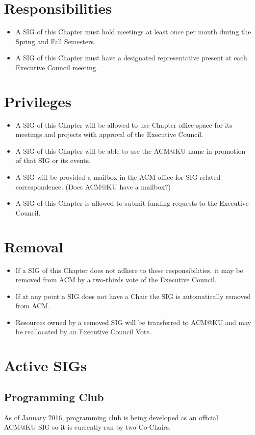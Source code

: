 \section{Responsibilities}
\begin{itemize}
   \item A SIG of this Chapter must hold meetings at least once per month during the Spring and Fall Semesters.
   \item A SIG of this Chapter must have a designated representative present at each Executive Council meeting.
\end{itemize}
\section{Privileges}
\begin{itemize}
   \item A SIG of this Chapter will be allowed to use Chapter office space for its meetings and projects with approval of the Executive Council.
   \item A SIG of this Chapter will be able to use the ACM@KU name in promotion of that SIG or its events.
   \item A SIG will be provided a mailbox in the ACM office for SIG related correspondence. (Does ACM@KU have a mailbox?)
   \item A SIG of this Chapter is allowed to submit funding requests to the Executive Council.
\end{itemize}
\section{Removal}
\begin{itemize}
   \item If a SIG of this Chapter does not adhere to these responsibilities, it may be removed from ACM by a two-thirds vote of the Executive Council.
   \item If at any point a SIG does not have a Chair the SIG is automatically removed from ACM.
   \item Resources owned by a removed SIG will be transferred to ACM@KU and may be reallocated by an Executive Council Vote.
\end{itemize}


\section{Active SIGs}

\subsection{Programming Club}
As of January 2016, programming club is being developed as an official ACM@KU SIG so it is currently ran by two Co-Chairs.

